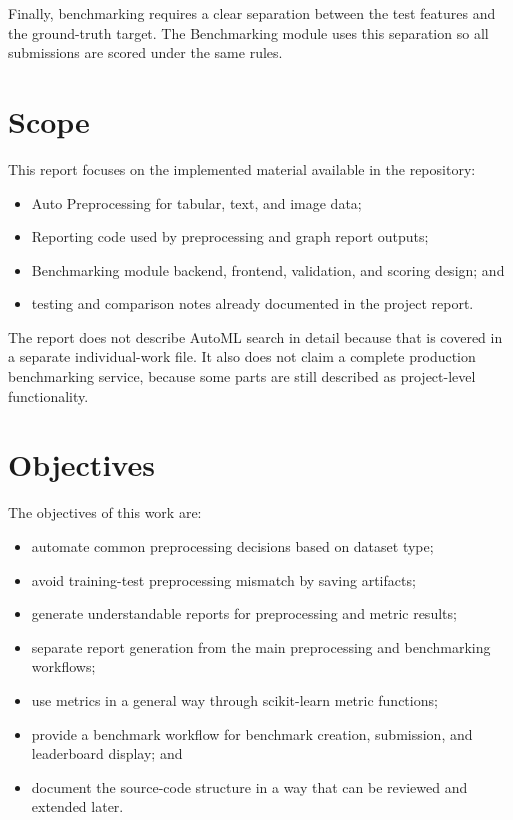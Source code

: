 \documentclass[12pt,a4paper,oneside]{report}
\begin{document}
Finally, benchmarking requires a clear separation between the test features and
the ground-truth target. The Benchmarking module uses this separation so all
submissions are scored under the same rules.

\section{Scope}

This report focuses on the implemented material available in the repository:

\begin{itemize}[leftmargin=*]
  \item Auto Preprocessing for tabular, text, and image data;
  \item Reporting code used by preprocessing and graph report outputs;
  \item Benchmarking module backend, frontend, validation, and scoring design; and
  \item testing and comparison notes already documented in the project report.
\end{itemize}

The report does not describe AutoML search in detail because that is covered in
a separate individual-work file. It also does not claim a complete production
benchmarking service, because some parts are still described as project-level
functionality.

\section{Objectives}

The objectives of this work are:

\begin{itemize}[leftmargin=*]
  \item automate common preprocessing decisions based on dataset type;
  \item avoid training-test preprocessing mismatch by saving artifacts;
  \item generate understandable reports for preprocessing and metric results;
  \item separate report generation from the main preprocessing and benchmarking
        workflows;
  \item use metrics in a general way through scikit-learn metric functions;
  \item provide a benchmark workflow for benchmark creation, submission, and
        leaderboard display; and
  \item document the source-code structure in a way that can be reviewed and
        extended later.
\end{itemize}
\end{document}
